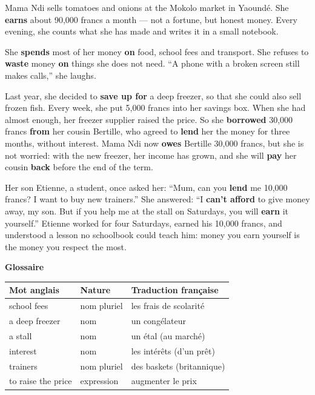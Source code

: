 \documentclass[11pt]{article}
\begin{document}
\begin{textebox}
Mama Ndi sells tomatoes and onions at the Mokolo market in Yaoundé. She \textbf{earns} about 90,000 francs a month — not a fortune, but honest money. Every evening, she counts what she has made and writes it in a small notebook.

She \textbf{spends} most of her money \textbf{on} food, school fees and transport. She refuses to \textbf{waste} money \textbf{on} things she does not need. “A phone with a broken screen still makes calls,” she laughs.

Last year, she decided to \textbf{save up for} a deep freezer, so that she could also sell frozen fish. Every week, she put 5,000 francs into her savings box. When she had almost enough, her freezer supplier raised the price. So she \textbf{borrowed} 30,000 francs \textbf{from} her cousin Bertille, who agreed to \textbf{lend} her the money for three months, without interest. Mama Ndi now \textbf{owes} Bertille 30,000 francs, but she is not worried: with the new freezer, her income has grown, and she will \textbf{pay} her cousin \textbf{back} before the end of the term.

Her son Etienne, a student, once asked her: “Mum, can you \textbf{lend} me 10,000 francs? I want to buy new trainers.” She answered: “I \textbf{can't afford} to give money away, my son. But if you help me at the stall on Saturdays, you will \textbf{earn} it yourself.” Etienne worked for four Saturdays, earned his 10,000 francs, and understood a lesson no schoolbook could teach him: money you earn yourself is the money you respect the most.
\end{textebox}

\textbf{Glossaire}

\begin{center}
\begin{tabularx}{\linewidth}{|l|l|X|}
\hline
\rowcolor{popblueL} Mot anglais & Nature & Traduction française \\
\hline
school fees & nom pluriel & les frais de scolarité \\
\hline
a deep freezer & nom & un congélateur \\
\hline
a stall & nom & un étal (au marché) \\
\hline
interest & nom & les intérêts (d'un prêt) \\
\hline
trainers & nom pluriel & des baskets (britannique) \\
\hline
to raise the price & expression & augmenter le prix \\
\hline
\end{tabularx}
\end{center}
\end{document}
